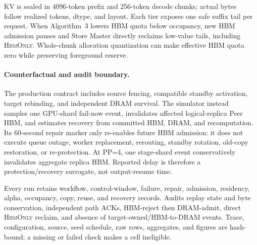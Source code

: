 KV is sealed in 4096-token prefix and 256-token decode chunks; actual bytes
follow realized tokens, dtype, and layout.  Each tier exposes one safe suffix
tail per request.  When Algorithm~3 lowers HBM quota below occupancy, new HBM
admission pauses and Store Master directly reclaims low-value tails, including
\textsc{HbmOnly}.  Whole-chunk allocation quantization can make effective HBM
quota zero while preserving foreground reserve.

\paragraph{Counterfactual and audit boundary.}
The production contract includes source fencing, compatible standby activation,
target rebinding, and independent DRAM survival.  The simulator instead samples
one GPU-shard fail-now event, invalidates affected logical-replica Peer HBM, and
estimates recovery from committed HBM, DRAM, and recomputation.  Its 60-second
repair marker only re-enables future HBM admission: it does not execute queue
outage, worker replacement, rerouting, standby rotation, old-copy restoration,
or re-protection.  At PP=4, one stage-shard event conservatively invalidates
aggregate replica HBM.  Reported delay is therefore a protection/recovery
surrogate, not output-resume time.

Every run retains workflow, control-window, failure, repair, admission,
residency, alpha, occupancy, copy, reuse, and recovery records.  Audits replay
state and byte conservation, independent path ACKs, HBM-reject then DRAM-admit,
direct \textsc{HbmOnly} reclaim, and absence of target-owned/HBM-to-DRAM events.
Trace, configuration, source, seed schedule, raw rows, aggregates, and figures
are hash-bound; a missing or failed check makes a cell ineligible.
